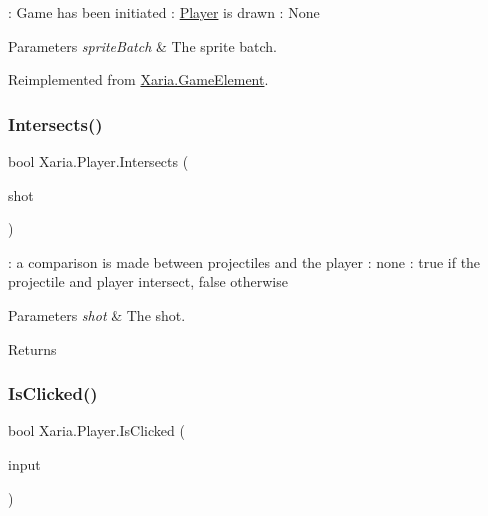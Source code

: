\+: Game has been initiated \+: \hyperlink{classXaria_1_1Player}{Player} is drawn \+: None 


\begin{DoxyParams}{Parameters}
{\em sprite\+Batch} & The sprite batch.\\
\hline
\end{DoxyParams}


Reimplemented from \hyperlink{classXaria_1_1GameElement_a812e0ffbe54519a3fb14a49115bf43d9}{Xaria.\+Game\+Element}.

\mbox{\label{classXaria_1_1Player_a9f8353151c84bf23a7fd646ffdefb852}} 
\subsubsection{\texorpdfstring{Intersects()}{Intersects()}}
{\footnotesize\ttfamily bool Xaria.\+Player.\+Intersects (\begin{DoxyParamCaption}\item[{\hyperlink{classXaria_1_1GameElement}{Game\+Element}}]{shot }\end{DoxyParamCaption})\hspace{0.3cm}{\ttfamily [inline]}}



\+: a comparison is made between projectiles and the player \+: none \+: true if the projectile and player intersect, false otherwise 


\begin{DoxyParams}{Parameters}
{\em shot} & The shot.\\
\hline
\end{DoxyParams}
\begin{DoxyReturn}{Returns}

\end{DoxyReturn}
\mbox{\label{classXaria_1_1Player_a24728ed29589e0601a9a0c9752f8e4bd}} 
\subsubsection{\texorpdfstring{Is\+Clicked()}{IsClicked()}}
{\footnotesize\ttfamily bool Xaria.\+Player.\+Is\+Clicked (\begin{DoxyParamCaption}\item[{Vector2}]{input }\end{DoxyParamCaption})\hspace{0.3cm}{\ttfamily [inline]}}



